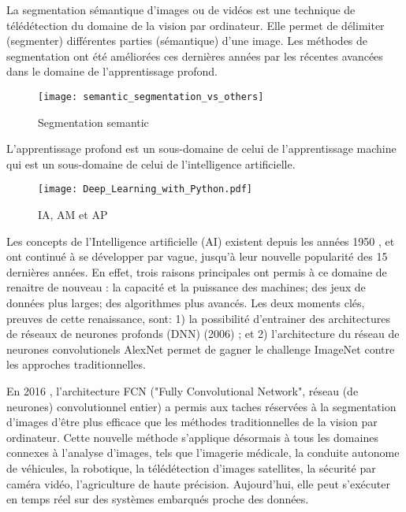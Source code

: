 ﻿\par La segmentation sémantique d'images ou de vidéos est une technique de télédétection du domaine de la vision par ordinateur. Elle permet de délimiter (segmenter) différentes parties (sémantique) d'une image. Les méthodes de segmentation ont été améliorées ces dernières années par les récentes avancées dans le domaine de l'apprentissage profond. 
\begin{figure}[H]
   \centering
   \texttt{[image: semantic\_segmentation\_vs\_others]}
   \caption[Segmentation semantic]{Segmentation semantic\cite[p.~1]{wu_recent_2019}}
   \label{fig:semantic_segmentation_vs_others}
\end{figure}
\par L’apprentissage profond est un sous-domaine de celui de l'apprentissage machine qui est un sous-domaine de celui de l'intelligence artificielle. 
\begin{figure}[H]
   \centering
   \texttt{[image: Deep\_Learning\_with\_Python.pdf]}
   \caption[IA, AM et AP]{IA, AM et AP \cite[p.~4]{chollet_deep_2018}}
   \label{fig:ia_ml_ap}
\end{figure}
\par Les concepts de l'Intelligence artificielle (AI) existent depuis les années 1950 \cite[p.~4]{chollet_deep_2018} \cite[p.~1]{alom_history_2018}, et ont continué à se développer par vague, jusqu'à leur nouvelle popularité des 15 dernières années. En effet, trois raisons principales ont permis à ce domaine de renaitre de nouveau \cite[p.~20]{chollet_deep_2018}: la capacité et la puissance des machines; des jeux de données plus larges; des algorithmes plus avancés. Les deux moments clés, preuves de cette renaissance, sont: 1) la possibilité d'entrainer des architectures de réseaux de neurones profonds (DNN) (2006) \cite[p.~6]{alom_history_2018}; et 2) l'architecture du réseau de neurones convolutionels AlexNet permet de  gagner le challenge ImageNet contre les approches traditionnelles\cite[p.~11]{alom_history_2018}. 
\par En 2016 \cite[p.~14]{alom_history_2018}, l'architecture FCN ("Fully Convolutional Network", réseau (de neurones) convolutionnel entier) a permis aux taches réservées à la segmentation d'images d'être plus efficace que les méthodes traditionnelles de la vision par ordinateur. Cette nouvelle méthode s'applique désormais à tous les domaines connexes à l'analyse d'images, tels que l'imagerie médicale, la conduite autonome de véhicules, la robotique, la télédétection d'images satellites, la sécurité par caméra vidéo, l'agriculture de haute précision. Aujourd'hui, elle peut s'exécuter en temps réel sur des systèmes embarqués proche des données. 